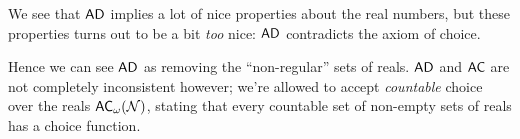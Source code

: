 We see that $\operatorname{\textsf{AD}}$ implies a lot of nice properties about the real numbers, but these properties turns out to be a bit \textit{too} nice: $\operatorname{\textsf{AD}}$ contradicts the axiom of choice.


Hence we can see $\operatorname{\textsf{AD}}$ as removing the ``non-regular'' sets of reals. $\operatorname{\textsf{AD}}$ and $\operatorname{\textsf{AC}}$ are not completely inconsistent however; we're allowed to accept \textit{countable} choice over the reals $\operatorname{\textsf{AC}}_\omega(\operatorname{\mathcal{N}})$, stating that every countable set of non-empty sets of reals has a choice function.



